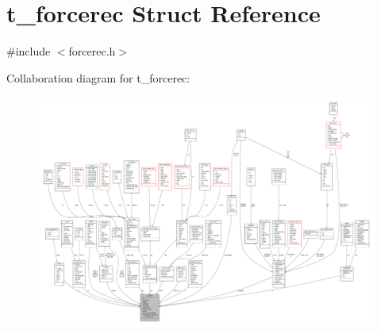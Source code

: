 \hypertarget{structt__forcerec}{\section{t\-\_\-forcerec \-Struct \-Reference}
\label{structt__forcerec}
}


{\ttfamily \#include $<$forcerec.\-h$>$}



\-Collaboration diagram for t\-\_\-forcerec\-:
\nopagebreak
\begin{figure}[H]
\begin{center}
\leavevmode
\includegraphics[width=350pt]{structt__forcerec__coll__graph}
\end{center}
\end{figure}
